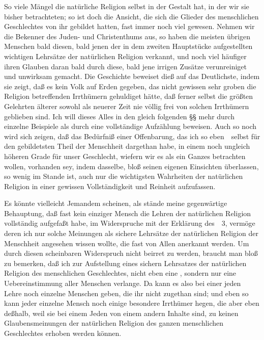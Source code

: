 
So viele Mängel die natürliche Religion selbst in der  Gestalt hat, in der wir sie bisher betrachteten; so ist doch die Ansicht, die sich die  Glieder des menschlichen Geschlechtes von ihr gebildet hatten, fast immer noch viel  gewesen. Nehmen wir die Bekenner des Juden- und Christenthums aus, so haben die meisten übrigen Menschen bald diesen, bald jenen der in dem zweiten Hauptstücke aufgestellten wichtigen Lehrsätze der natürlichen Religion verkannt, und noch viel häufiger ihren Glauben daran bald durch diese, bald jene irrigen Zusätze verunreiniget und unwirksam gemacht. Die Geschichte beweiset dieß auf das Deutlichste, indem sie zeigt, daß es kein Volk auf Erden gegeben, das nicht gewissen sehr groben die Religion betreffenden Irrthümern gehuldiget hätte, daß ferner selbst die größten Gelehrten älterer sowohl als neuerer Zeit nie völlig frei von solchen Irrthümern geblieben sind. Ich will dieses Alles in den gleich folgenden §§ mehr durch einzelne Beispiele als durch eine vollständige Aufzählung beweisen. Auch so noch wird sich zeigen, daß das Bedürfniß einer Offenbarung, das ich so eben~\ selbst für den gebildetsten Theil der Menschheit dargethan habe, in einem noch ungleich höheren Grade für unser Geschlecht, wiefern wir es als ein Ganzes betrachten wollen, vorhanden sey, indem dasselbe, bloß seinen eigenen Einsichten überlassen, so wenig im Stande ist, auch nur die wichtigsten Wahrheiten der natürlichen Religion in einer gewissen Vollständigkeit und Reinheit aufzufassen.
\begin{RWanm}
Es könnte vielleicht Jemandem scheinen, als stände meine gegenwärtige Behauptung, daß fast kein einziger Mensch die Lehren der natürlichen Religion vollständig aufgefaßt habe, im Widerspruche mit der Erklärung des \ \no\,3, vermöge deren ich nur solche Meinungen als sichere Lehrsätze der natürlichen Religion der Menschheit angesehen wissen wollte, die fast von Allen anerkannt werden. Um durch diesen scheinbaren Widerspruch nicht beirret zu werden, braucht man bloß zu bemerken, daß ich zur Aufstellung eines sichern Lehrsatzes der natürlichen Religion des menschlichen Geschlechtes, nicht eben eine , sondern nur eine  Uebereinstimmung aller Menschen verlange. Da kann es also bei einer jeden Lehre noch einzelne Menschen geben, die ihr nicht zugethan sind; und eben so kann jeder einzelne Mensch noch einige besondere Irrthümer hegen, die aber eben deßhalb, weil sie bei einem Jeden von einem andern Inhalte sind, zu keinen Glaubensmeinungen der natürlichen Religion des ganzen menschlichen Geschlechtes erhoben werden können. 
\end{RWanm}

